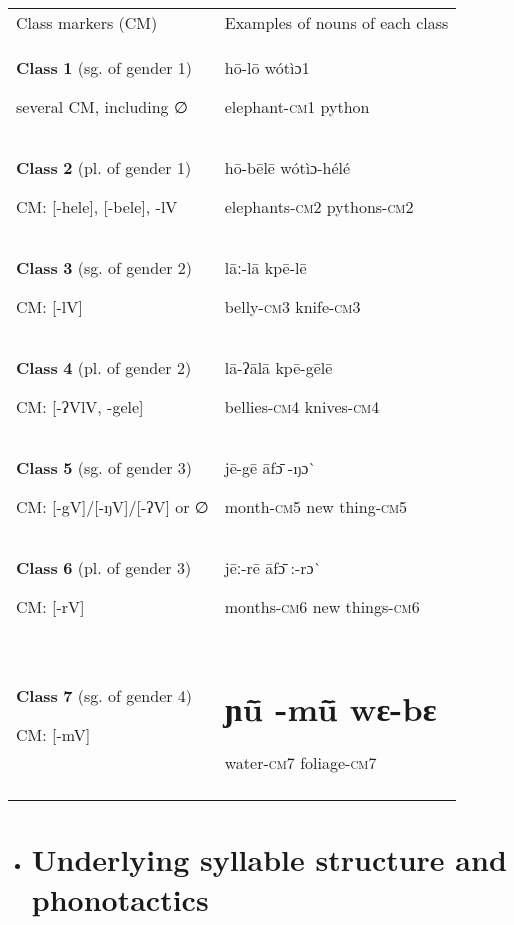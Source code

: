 \begin{tabularx}{\textwidth}{XX}
\lsptoprule

Class markers (CM) & Examples of nouns of each class\\
\textbf{Class} \textbf{1} (sg. of gender 1)

       several CM, including ∅ & hō-lō                      wótìɔ1   

elephant-\textsc{cm1}            python\\
\textbf{Class} \textbf{2} (pl. of gender 1) 

       CM: [-hele], [-bele], -lV & hō-bēlē                    wótìɔ-hélé

elephants-\textsc{cm2}           pythons{}-\textsc{cm2}\\
\textbf{Class} \textbf{3} (sg. of gender 2)

        CM: [-lV] & lāː-lā                      kpē-lē

belly{}-\textsc{cm3}                knife{}-\textsc{cm3}\\
\textbf{Class} \textbf{4} (pl. of gender 2) 

        CM: [-ʔVlV, -gele] & lā-ʔālā                      kpē-gēlē

bellies-\textsc{cm4}                 knives{}-\textsc{cm4}\\
\textbf{Class} \textbf{5} (sg. of gender 3)

       CM: [-gV]/[-ŋV]/[-ʔV] or ∅ & jē-gē                        āfɔ\={} {}-ŋɔ\`{} 

month-\textsc{cm5}                 new thing\-{}-\textsc{cm5}\\
\textbf{Class} \textbf{6} (pl. of gender 3) 

       CM: [-rV] & jēː-rē                       āfɔ\={} :-rɔ\`{} 

months-\textsc{cm6}              new things{}-\textsc{cm6}\\
\textbf{Class} \textbf{7} (sg. of gender 4)

       CM: [-mV] & \section{ɲũ\={} {}-mũ\={}                     wɛ-bɛ} 
water-\textsc{cm7}                  foliage{}-\textsc{cm7}\\
\lspbottomrule
\end{tabularx}

\begin{itemize}
\item \section{ Underlying syllable structure and phonotactics}\end{itemize}

